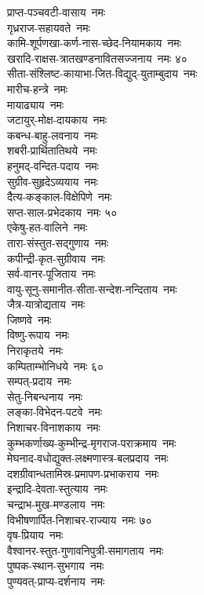\begin{multicols}{2}
\begin{flushleft}
प्राप्त-पञ्चवटी-वासाय~नमः\\
गृध्रराज-सहायवते~नमः\\
कामि-शूर्पणखा-कर्ण-नास-च्छेद-नियामकाय~नमः\\
खरादि-राक्षस-त्रातखण्डनावितसज्जनाय~नमः \hfill ४०\\
सीता-संश्लिष्ट-कायाभा-जित-विद्युद्-युताम्बुदाय~नमः\\
मारीच-हन्त्रे~नमः\\
मायाढ्याय~नमः\\
जटायुर्-मोक्ष-दायकाय~नमः\\
कबन्ध-बाहु-लवनाय~नमः\\
शबरी-प्रार्थितातिथये~नमः\\
हनुमद्-वन्दित-पदाय~नमः\\
सुग्रीव-सुहृदेऽव्ययाय~नमः\\
दैत्य-कङ्काल-विक्षेपिणे~नमः\\
सप्त-साल-प्रभेदकाय~नमः \hfill ५०\\
एकेषु-हत-वालिने~नमः\\
तारा-संस्तुत-सद्गुणाय~नमः\\
कपीन्द्री-कृत-सुग्रीवाय~नमः\\
सर्व-वानर-पूजिताय~नमः\\
वायु-सूनु-समानीत-सीता-सन्देश-नन्दिताय~नमः\\
जैत्र-यात्रोद्यताय~नमः\\
जिष्णवे~नमः\\
विष्णु-रूपाय~नमः\\
निराकृतये~नमः\\
कम्पिताम्भोनिधये~नमः \hfill ६०\\
सम्पत्-प्रदाय~नमः\\
सेतु-निबन्धनाय~नमः\\
लङ्का-विभेदन-पटवे~नमः\\
निशाचर-विनाशकाय~नमः\\
कुम्भकर्णाख्य-कुम्भीन्द्र-मृगराज-पराक्रमाय~नमः\\
मेघनाद-वधोद्युक्त-लक्ष्मणास्त्र-बलप्रदाय~नमः\\
दशग्रीवान्धतामिस्र-प्रमापण-प्रभाकराय~नमः\\
इन्द्रादि-देवता-स्तुत्याय~नमः\\
चन्द्राभ-मुख-मण्डलाय~नमः\\
विभीषणार्पित-निशाचर-राज्याय~नमः \hfill ७०\\
वृष-प्रियाय~नमः \\
वैश्वानर-स्तुत-गुणावनिपुत्री-समागताय~नमः\\
पुष्पक-स्थान-सुभगाय~नमः\\
पुण्यवत्-प्राप्य-दर्शनाय~नमः\\

\end{flushleft}
\end{multicols}
